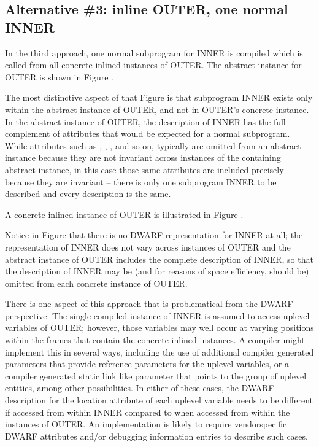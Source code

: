 \subsection{Alternative \#3: inline OUTER, one normal INNER}
\label{app:inlineouteronenormalinner}

In the third approach, one normal subprogram for INNER is
compiled which is called from all concrete inlined instances of
OUTER. The abstract instance for OUTER is shown in 
Figure .

The most distinctive aspect of that Figure is that subprogram
INNER exists only within the abstract instance of OUTER,
and not in OUTER\textquoteright s concrete instance. In the abstract
instance of OUTER, the description of INNER has the full
complement of attributes that would be expected for a
normal subprogram. 
While attributes such as 
,
, 
,
and so on, typically are omitted
from 
an 
abstract instance because they are not invariant across
instances of the containing abstract instance, in this case
those same attributes are included precisely because they are
invariant -- there is only one subprogram INNER to be described
and every description is the same.

A concrete inlined instance of OUTER is illustrated in
Figure .

Notice in 
Figure 
that there is no DWARF representation for
INNER at all; the representation of INNER does not vary across
instances of OUTER and the abstract instance of OUTER includes
the complete description of INNER, so that the description of
INNER may be (and for reasons of space efficiency, should be)
omitted from each 
concrete instance of OUTER.

There is one aspect of this approach that is problematical from
the DWARF perspective. The single compiled instance of INNER
is assumed to access up\dash level variables of OUTER; however,
those variables may well occur at varying positions within
the frames that contain the 
concrete inlined instances. A
compiler might implement this in several ways, including the
use of additional compiler generated parameters that provide
reference parameters for the up\dash level variables, or a compiler
generated static link like parameter that points to the group
of up\dash level entities, among other possibilities. In either of
these cases, the DWARF description for the location attribute
of each uplevel variable needs to be different if accessed
from within INNER compared to when accessed from within the
instances of OUTER. An implementation is likely to require
vendor\dash specific DWARF attributes and/or debugging information
entries to describe such cases.

